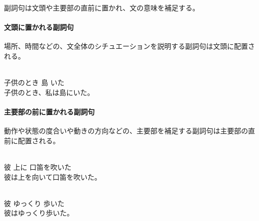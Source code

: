 副詞句は文頭や主要部の直前に置かれ、文の意味を補足する。

\paragraph{文頭に置かれる副詞句}
場所、時間などの、文全体のシチュエーションを説明する副詞句は文頭に配置される。

\begin{exe}
    \ex \gll [mipop\'a] [rep\'a] [ap\'a] \\
        子供のとき 島 いた \\
    \glt 子供のとき、私は島にいた。
\end{exe}

\paragraph{主要部の前に置かれる副詞句}
動作や状態の度合いや動きの方向などの、主要部を補足する副詞句は主要部の直前に配置される。

\begin{exe}
    \ex \gll [k\'ap\'a] [nani] [piti r\'ar\'ep\'a] \\
        彼 上に 口笛を吹いた \\
    \glt 彼は上を向いて口笛を吹いた。
\end{exe}
\begin{exe}
    \ex \gll [k\'ap\'a] [piti] [t\'iv\'op\'a] \\
        彼 ゆっくり 歩いた \\
    \glt 彼はゆっくり歩いた。
\end{exe}